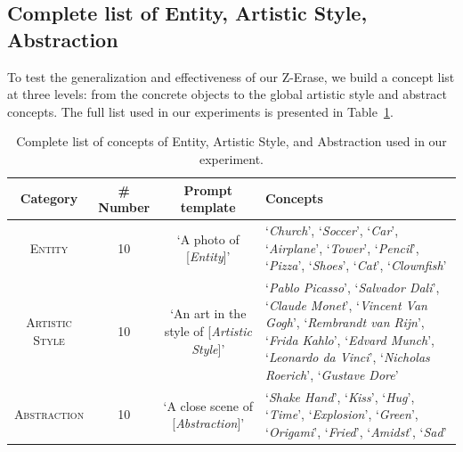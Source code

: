 \subsection{Complete list of Entity, Artistic Style, Abstraction}
\label{appendix: Complete list of Entity, Artistic Style, Abstraction}
To test the generalization and effectiveness of our Z-Erase, we build a concept list at three levels: from the concrete objects to the global artistic style and abstract concepts. The full list used in our experiments is presented in Table~\ref{tab: Complete list of concepts of Entity, Artistic Style, and Abstraction used in our experiment}.
\begin{table}[t]
\centering
\caption{Complete list of concepts of Entity, Artistic Style, and Abstraction used in our experiment.}
\label{tab: Complete list of concepts of Entity, Artistic Style, and Abstraction used in our experiment}
\begin{tabular}{cccm{}}
\hline
\textbf{Category} & \textbf{\# Number} & \textbf{Prompt template} & \textbf{Concepts} \\ \hline
\textsc{Entity} & 10 & ‘A photo of [\textit{Entity}]’ & ‘\textit{Church}’, ‘\textit{Soccer}’, ‘\textit{Car}’, ‘\textit{Airplane}’, ‘\textit{Tower}’, ‘\textit{Pencil}’, ‘\textit{Pizza}’, ‘\textit{Shoes}’, ‘\textit{Cat}’, ‘\textit{Clownfish}’ \\ \hline
\textsc{Artistic Style} & 10 & ‘An art in the style of [\textit{Artistic Style}]’ & ‘\textit{Pablo Picasso}’, ‘\textit{Salvador Dali}’, ‘\textit{Claude Monet}’, ‘\textit{Vincent Van Gogh}’, ‘\textit{Rembrandt van Rijn}’, ‘\textit{Frida Kahlo}’, ‘\textit{Edvard Munch}’, ‘\textit{Leonardo da Vinci}’, ‘\textit{Nicholas Roerich}’, ‘\textit{Gustave Dore}’ \\ \hline
\textsc{Abstraction} & 10 & ‘A close scene of [\textit{Abstraction}]’ & ‘\textit{Shake Hand}’, ‘\textit{Kiss}’, ‘\textit{Hug}’, ‘\textit{Time}’, ‘\textit{Explosion}’, ‘\textit{Green}’, ‘\textit{Origami}’, ‘\textit{Fried}’, ‘\textit{Amidst}’, ‘\textit{Sad}’ \\ \hline
\end{tabular}
\end{table}

